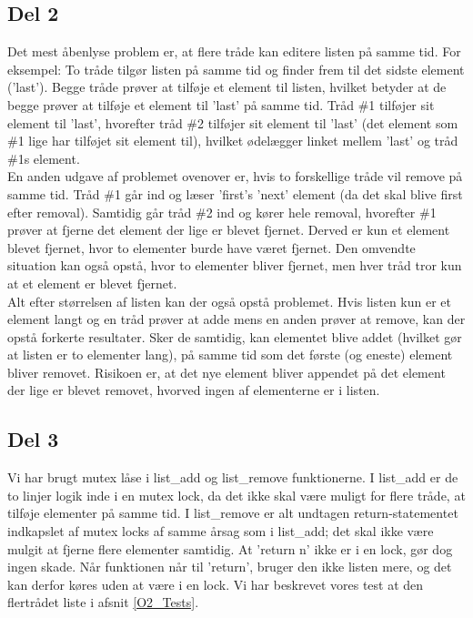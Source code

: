 \subsection{Del 2}
\label{O2_2}
Det mest åbenlyse problem er, at flere tråde kan editere listen på samme tid. For eksempel: To tråde tilgør listen på samme tid og finder frem til det sidste element ('last'). Begge tråde prøver at tilføje et element til listen, hvilket betyder at de begge prøver at tilføje et element til 'last' på samme tid. Tråd \#1 tilføjer sit element til 'last', hvorefter tråd \#2 tilføjer sit element til 'last' (det element som \#1 lige har tilføjet sit element til), hvilket ødelægger linket mellem 'last' og tråd \#1s element.
\\En anden udgave af problemet ovenover er, hvis to forskellige tråde vil remove på samme tid. Tråd \#1 går ind og læser 'first's 'next' element (da det skal blive first efter removal). Samtidig går tråd \#2 ind og kører hele removal, hvorefter \#1 prøver at fjerne det element der lige er blevet fjernet. Derved er kun et element blevet fjernet, hvor to elementer burde have været fjernet. Den omvendte situation kan også opstå, hvor to elementer bliver fjernet, men hver tråd tror kun at et element er blevet fjernet.
\\Alt efter størrelsen af listen kan der også opstå problemet. Hvis listen kun er et element langt og en tråd prøver at adde mens en anden prøver at remove, kan der opstå forkerte resultater. Sker de samtidig, kan elementet blive addet (hvilket gør at listen er to elementer lang), på samme tid som det første (og eneste) element bliver removet. Risikoen er, at det nye element bliver appendet på det element der lige er blevet removet, hvorved ingen af elementerne er i listen.

\subsection{Del 3}
\label{O2_3}
Vi har brugt mutex låse i list\_add og list\_remove funktionerne. I list\_add er de to linjer logik inde i en mutex lock, da det ikke skal være muligt for flere tråde, at tilføje elementer på samme tid. I list\_remove er alt undtagen return-statementet indkapslet af mutex locks af samme årsag som i list\_add; det skal ikke være mulgit at fjerne flere elementer samtidig. At 'return n' ikke er i en lock, gør dog ingen skade. Når funktionen når til 'return', bruger den ikke listen mere, og det kan derfor køres uden at være i en lock.
Vi har beskrevet vores test at den flertrådet liste i afsnit \ref{O2_Tests}.

